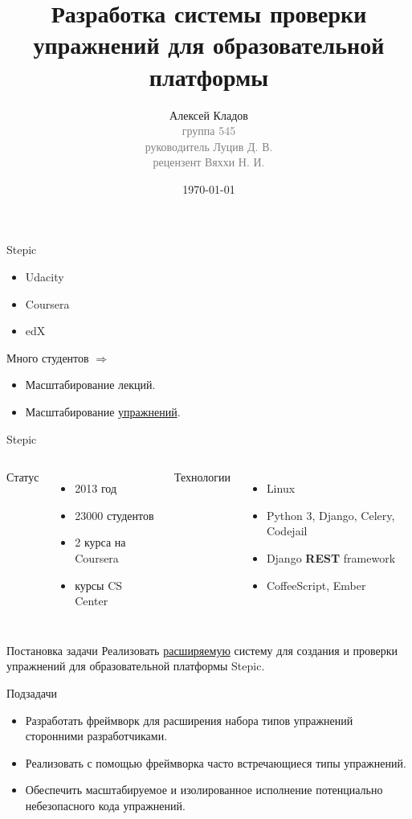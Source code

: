 \documentclass{beamer}
\title[Упражнения в Stepic]{Разработка системы проверки упражнений для
  образовательной платформы}
\author{Алексей Кладов\\
  { \footnotesize \textcolor{gray}{группа 545\\
      руководитель Луцив Д. В.\\
      рецензент Вяххи Н. И.}}}
\institute[СПбГУ]{Санкт-Петербургский государственный университет}
\date{\today} %
\begin{document}
\begin{frame}
\titlepage %
\end{frame}

\begin{frame}{Stepic}
  \begin{itemize}
  \item Udacity
  \item Coursera
  \item edX
  \end{itemize}

  \bigskip

  Много студентов $\Rightarrow$
  \begin{itemize}
  \item Масштабирование лекций.
  \item Масштабирование \underline{упражнений}.
  \end{itemize}
\end{frame}

\begin{frame}{Stepic}
  \begin{columns}[t]
    Статус
    \begin{itemize}
    \item 2013 год
    \item 23000 студентов
    \item 2 курса на Coursera
    \item курсы CS Center
    \end{itemize}

    Технологии
    \begin{itemize}
    \item Linux
    \item Python 3, Django, Celery, Codejail
    \item Django \textbf{REST} framework
    \item CoffeeScript, Ember
    \end{itemize}
  \end{columns}

\end{frame}

\begin{frame}{Постановка задачи}
  Реализовать \underline{расширяемую} систему для создания и проверки упражнений
  для образовательной платформы Stepic.

  \medskip

  Подзадачи
  \begin{itemize}
  \item Разработать фреймворк для расширения набора типов упражнений
    сторонними разработчиками.
  \item Реализовать с помощью фреймворка часто встречающиеся типы упражнений.
  \item Обеспечить масштабируемое и изолированное исполнение
    потенциально небезопасного кода упражнений.
  \end{itemize}
\end{frame}
\end{document}
